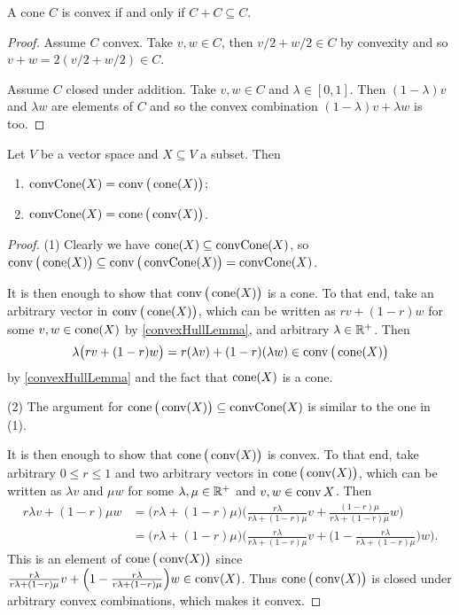 \begin{lemma} \label{convexityAdditiveClosure}
A cone $C$ is convex if and only if $C + C \subseteq C$. 
\end{lemma}
\begin{proof}
Assume $C$ convex. Take $v,w\in C$, then $v/2 + w/2\in C$ by convexity and so $v+w = 2(v/2+w/2)\in C$.

Assume $C$ closed under addition. Take $v,w\in C$ and $\lambda\in[0,1]$. Then $(1-\lambda)v$ and $\lambda w$ are elements of $C$ and so the convex combination $(1-\lambda)v + \lambda w$ is too.
\end{proof}

\begin{lemma}
Let $V$ be a vector space and $X\subseteq V$ a subset. Then
\begin{enumerate}
\item $\operatorname{convCone}(X) = \operatorname{conv}\big(\operatorname{cone}(X)\big)$;
\item $\operatorname{convCone}(X) = \operatorname{cone}\big(\operatorname{conv}(X)\big)$.
\end{enumerate}
\end{lemma}
\begin{proof}
(1) Clearly we have $\operatorname{cone}(X) \subseteq \operatorname{convCone}(X)$, so $\operatorname{conv}\big(\operatorname{cone}(X)\big) \subseteq \operatorname{conv}\big(\operatorname{convCone}(X)\big) = \operatorname{convCone}(X)$.

It is then enough to show that $\operatorname{conv}\big(\operatorname{cone}(X)\big)$ is a cone. To that end, take an arbitrary vector in $\operatorname{conv}\big(\operatorname{cone}(X)\big)$, which can be written as $r v + (1-r)w$ for some $v,w\in \operatorname{cone}(X)$ by \ref{convexHullLemma}, and arbitrary $\lambda \in \mathbb{R}^+$. Then
\[ \lambda \big(r v + (1-r)w\big) = r (\lambda v) + (1-r)(\lambda w) \in \operatorname{conv}\big(\operatorname{cone}(X)\big)
\]
by \ref{convexHullLemma} and the fact that $\operatorname{cone}(X)$ is a cone.

(2) The argument for $\operatorname{cone}\big(\operatorname{conv}(X)\big) \subseteq \operatorname{convCone}(X)$ is similar to the one in (1).

It is then enough to show that $\operatorname{cone}\big(\operatorname{conv}(X)\big)$ is convex. To that end, take arbitrary $0\leq r\leq 1$ and two arbitrary vectors in $\operatorname{cone}\big(\operatorname{conv}(X)\big)$, which can be written as $\lambda v$ and $\mu w$ for some $\lambda,\mu\in \mathbb{R}^+$ and $v,w\in \operatorname{conv}{X}$. Then
\begin{align*}
r\lambda v + (1-r)\mu w &= \big(r\lambda + (1-r)\mu\big)\Big(\frac{r\lambda}{r\lambda + (1-r)\mu}v + \frac{(1-r)\mu}{r\lambda + (1-r)\mu}w\Big) \\
&= \big(r\lambda + (1-r)\mu\big)\bigg(\frac{r\lambda}{r\lambda + (1-r)\mu}v + \Big(1 - \frac{r\lambda}{r\lambda + (1-r)\mu}\Big)w\bigg).
\end{align*}
This is an element of $\operatorname{cone}\big(\operatorname{conv}(X)\big)$ since $\frac{r\lambda}{r\lambda + (1-r)\mu}v + \Big(1 - \frac{r\lambda}{r\lambda + (1-r)\mu}\Big)w\in \operatorname{conv}(X)$. Thus $\operatorname{cone}\big(\operatorname{conv}(X)\big)$ is closed under arbitrary convex combinations, which makes it convex.
\end{proof}

